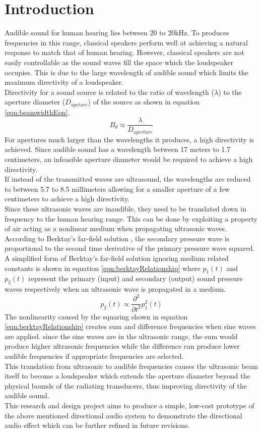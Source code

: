 \section{Introduction}
Audible sound for human hearing lies between 20 to 20kHz. To produces frequencies in this range, classical speakers perform well at achieving a natural response to match that of human hearing. However, classical speakers are not easily controllable as the sound waves fill the space which the loudspeaker occupies. This is due to the large wavelength of audible sound which limits the maximum directivity of a loudspeaker.\\
Directivity for a sound source is related to the ratio of wavelength ($\lambda$) to the aperture diameter ($D_{apeture}$) of the source as shown in equation \ref{eqn:beamwidthEqn}.
\begin{equation}
    B_\theta \approx \frac{\lambda}{D_{aperture}}
    \label{eqn:beamwidthEqn}
\end{equation}
For apertures much larger than the wavelengths it produces, a high directivity is achieved. Since audible sound has a wavelength between 17 meters to 1.7 centimeters, an infeasible aperture diameter would be required to achieve a high directivity.\\
If instead of the transmitted waves are ultrasound, the wavelengths are reduced to between 5.7 to 8.5 millimeters allowing for a smaller aperture of a few centimeters to achieve a high directivity.\\

Since these ultrasonic waves are inaudible, they need to be translated down in frequency to the human hearing range. This can be done by exploiting a property of air acting as a nonlinear medium when propagating ultrasonic waves. According to Berktay's far-field solution \cite{berktay_1965}, the secondary pressure wave is proportional to the second time derivative of the primary pressure wave squared. A simplified form of Berktay's far-field solution ignoring medium related constants is shown in equation \ref{eqn:berktayRelationship} where $p_1 (t)$ and $p_2 (t)$ represent the primary (input) and secondary (output) sound pressure waves respectively when an ultrasonic wave is propagated in a medium.
\begin{equation}
    p_2(t) \propto \frac{\partial^2}{\partial t^2}p_1^2(t)
    \label{eqn:berktayRelationship}
\end{equation}
The nonlinearity caused by the squaring shown in equation \ref{eqn:berktayRelationship} creates sum and difference frequencies when sine waves are applied. since the sine waves are in the ultrasonic range, the sum would produce higher ultrasonic frequencies while the difference can produce lower audible frequencies if appropriate frequencies are selected.\\
This translation from ultrasonic to audible frequencies causes the ultrasonic beam itself to become a loudspeaker which extends the aperture diameter beyond the physical bounds of the radiating transducers, thus improving directivity of the audible sound.\\

This research and design project aims to produce a simple, low-cost prototype of the above mentioned directional audio system to demonstrate the directional audio effect which can be further refined in future revisions.